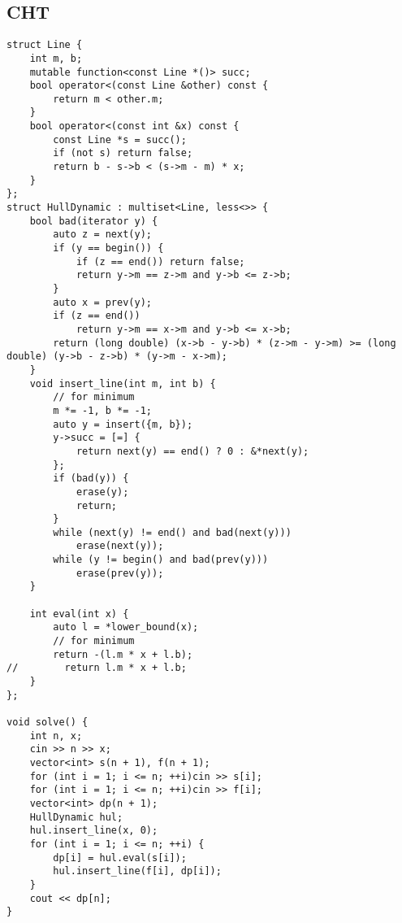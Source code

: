 \documentclass[twoside]{article}
\begin{document}
\begin{multicols*}{2}
{
\subsection*{CHT}
}
\begin{verbatim}
struct Line {
    int m, b;
    mutable function<const Line *()> succ;
    bool operator<(const Line &other) const {
        return m < other.m;
    }
    bool operator<(const int &x) const {
        const Line *s = succ();
        if (not s) return false;
        return b - s->b < (s->m - m) * x;
    }
};
struct HullDynamic : multiset<Line, less<>> {
    bool bad(iterator y) {
        auto z = next(y);
        if (y == begin()) {
            if (z == end()) return false;
            return y->m == z->m and y->b <= z->b;
        }
        auto x = prev(y);
        if (z == end())
            return y->m == x->m and y->b <= x->b;
        return (long double) (x->b - y->b) * (z->m - y->m) >= (long double) (y->b - z->b) * (y->m - x->m);
    }
    void insert_line(int m, int b) {
        // for minimum
        m *= -1, b *= -1;
        auto y = insert({m, b});
        y->succ = [=] {
            return next(y) == end() ? 0 : &*next(y);
        };
        if (bad(y)) {
            erase(y);
            return;
        }
        while (next(y) != end() and bad(next(y)))
            erase(next(y));
        while (y != begin() and bad(prev(y)))
            erase(prev(y));
    }

    int eval(int x) {
        auto l = *lower_bound(x);
        // for minimum
        return -(l.m * x + l.b);
//        return l.m * x + l.b;
    }
};

void solve() {
    int n, x;
    cin >> n >> x;
    vector<int> s(n + 1), f(n + 1);
    for (int i = 1; i <= n; ++i)cin >> s[i];
    for (int i = 1; i <= n; ++i)cin >> f[i];
    vector<int> dp(n + 1);
    HullDynamic hul;
    hul.insert_line(x, 0);
    for (int i = 1; i <= n; ++i) {
        dp[i] = hul.eval(s[i]);
        hul.insert_line(f[i], dp[i]);
    }
    cout << dp[n];
}
\end{verbatim}

{
}
\end{multicols*}
\end{document}
